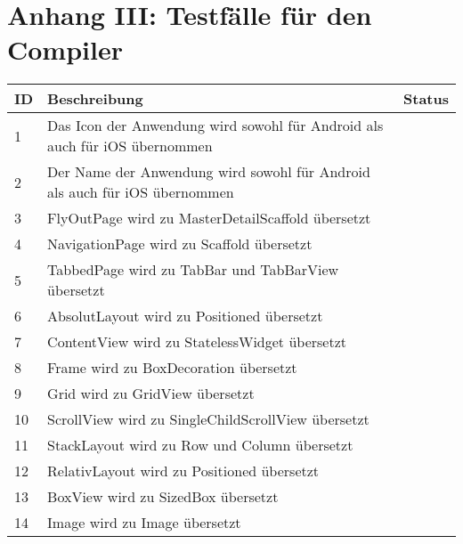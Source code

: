 \chapter{Anhang III: Testfälle für den Compiler}
\label{chap:Testfälle}

\begin{xltabular}{\textwidth}{l|X|l}
   \textbf{ID} & \textbf{Beschreibung} & \textbf{Status}  \\  
\hline

	1             			& 			Das Icon der Anwendung wird sowohl für Android als auch für iOS übernommen       &  \checkmark   	\\ 
	2             			& 			Der Name der Anwendung wird sowohl für Android als auch für iOS übernommen       &  \checkmark   	\\ 

	3            			& 			FlyOutPage wird zu MasterDetailScaffold übersetzt      &  \checkmark   	\\ 
	4            			& 			NavigationPage wird zu Scaffold übersetzt      &  \checkmark   	\\ 
	5            			& 			TabbedPage wird zu TabBar und TabBarView übersetzt      &  \checkmark   	\\ 
	
	
	6            			& 			AbsolutLayout wird zu Positioned übersetzt      &  \checkmark   	\\ 
	7            			& 			ContentView wird zu StatelessWidget übersetzt      &  \checkmark   	\\ 
	8            			& 			Frame wird zu BoxDecoration übersetzt      &  \checkmark   	\\ 
	9            			& 			Grid wird zu GridView übersetzt      &  \checkmark   	\\ 
	10            			& 			ScrollView wird zu SingleChildScrollView übersetzt      &  \checkmark   	\\ 
	11           			& 			StackLayout wird zu Row und Column übersetzt     &  \checkmark   	\\ 
	12            			& 			RelativLayout wird zu Positioned übersetzt      &  \checkmark   	\\ 
	
	
	13            			& 	BoxView		       				wird zu   	 	SizedBox  	übersetzt	 &  \checkmark   	\\ 
	 
	14            			& Image       							wird zu	     	Image	 		übersetzt	 &  \checkmark   	\\ 
	 

\end{xltabular}
